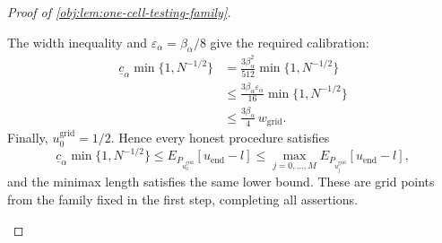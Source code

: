 \begin{proof}[Proof of \cref{obj:lem:one-cell-testing-family}]
\begin{enumerate}
The width inequality and
\(\varepsilon_\alpha=\beta_\alpha/8\) give the required calibration:
\[
\begin{aligned}
\underline c_\alpha\min\{1,N^{-1/2}\}
&=
\frac{3\beta_\alpha^2}{512}
\min\{1,N^{-1/2}\}\\
&\le
\frac{3\beta_\alpha\varepsilon_\alpha}{16}
\min\{1,N^{-1/2}\}\\
&\le
\frac{3\beta_\alpha}{4}\,w_{\mathrm{grid}}.
\end{aligned}
\]
Finally, \(u_0^{\mathrm{grid}}=1/2\). Hence every honest procedure satisfies
\[
\underline c_\alpha\min\{1,N^{-1/2}\}
\le
E_{P_{u_0^{\mathrm{grid}}}}[u_{\mathrm{end}}-l]
\le
\max_{j=0,\ldots,M}E_{P_{u_j^{\mathrm{grid}}}}[u_{\mathrm{end}}-l],
\]
and the minimax length satisfies the same lower bound. These are grid points from the family fixed in the first step, completing all assertions.
\end{enumerate}
\end{proof}
